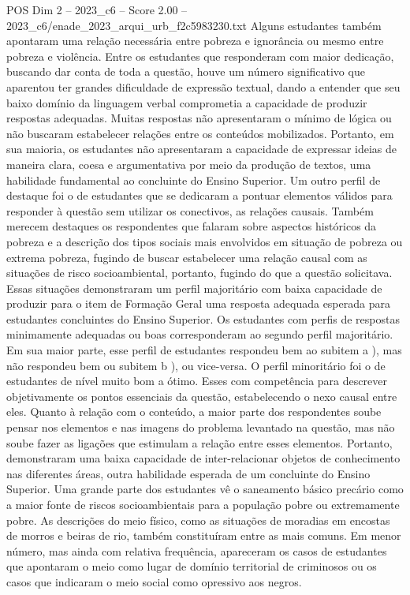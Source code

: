 \begin{textsample}{POS Dim 2 – 2023\_c6 – Score 2.00 – 2023\_c6/enade\_2023\_arqui\_urb\_f2c5983230.txt}
Alguns estudantes também apontaram uma relação necessária entre pobreza e ignorância ou mesmo entre pobreza e violência.
Entre os estudantes que responderam com maior dedicação, buscando dar conta de toda a questão, houve um número significativo que aparentou ter grandes dificuldade de expressão textual, dando a entender que seu baixo domínio da linguagem verbal comprometia a capacidade de produzir respostas adequadas.
Muitas respostas não apresentaram o mínimo de lógica ou não buscaram estabelecer relações entre os conteúdos mobilizados.
Portanto, em sua maioria, os estudantes não apresentaram a capacidade de expressar ideias de maneira clara, coesa e argumentativa por meio da produção de textos, uma habilidade fundamental ao concluinte do Ensino Superior.
Um outro perfil de destaque foi o de estudantes que se dedicaram a pontuar elementos válidos para responder à questão sem utilizar os conectivos, as relações causais.
Também merecem destaques os respondentes que falaram sobre aspectos históricos da pobreza e a descrição dos tipos sociais mais envolvidos em situação de pobreza ou extrema pobreza, fugindo de buscar estabelecer uma relação causal com as situações de risco socioambiental, portanto, fugindo do que a questão solicitava.
Essas situações demonstraram um perfil majoritário com baixa capacidade de produzir para o item de Formação Geral uma resposta adequada esperada para estudantes concluintes do Ensino Superior.
Os estudantes com perfis de respostas minimamente adequadas ou boas corresponderam ao segundo perfil majoritário.
Em sua maior parte, esse perfil de estudantes respondeu bem ao subitem a ), mas não respondeu bem ou subitem b ), ou vice-versa.
O perfil minoritário foi o de estudantes de nível muito bom a ótimo.
Esses com competência para descrever objetivamente os pontos essenciais da questão, estabelecendo o nexo causal entre eles.
Quanto à relação com o conteúdo, a maior parte dos respondentes soube pensar nos elementos e nas imagens do problema levantado na questão, mas não soube fazer as ligações que estimulam a relação entre esses elementos.
Portanto, demonstraram uma baixa capacidade de inter-relacionar objetos de conhecimento nas diferentes áreas, outra habilidade esperada de um concluinte do Ensino Superior.
Uma grande parte dos estudantes vê o saneamento básico precário como a maior fonte de riscos socioambientais para a população pobre ou extremamente pobre.
As descrições do meio físico, como as situações de moradias em encostas de morros e beiras de rio, também constituíram entre as mais comuns.
Em menor número, mas ainda com relativa frequência, apareceram os casos de estudantes que apontaram o meio como lugar de domínio territorial de criminosos ou os casos que indicaram o meio social como opressivo aos negros.

\end{textsample}
